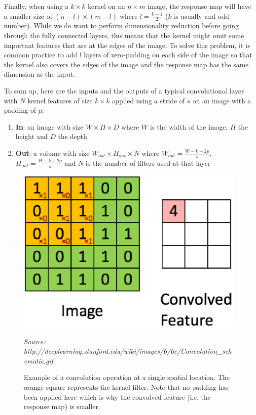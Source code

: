 \documentclass[12pt,twoside]{article}
\newcommand{\source}[1]{\vspace{-3pt} \caption*{ \footnotesize{\textit{Source: {#1}}}} }
\begin{document}
Finally, when using a $k\times k$ kernel on an $n \times m$ image, the response map will have a smaller
size of $(n-l)\times(m-l)$ where $l=\frac{k-1}{2}$ ($k$ is usually and odd
number). While we do want to perform dimensionality reduction before going
through the fully connected layers, this means that the kernel might omit some
important features that are at the edges of the image. To solve this problem,
it is common practice to add $l$ layers of zero-padding on each side of the
image so that the kernel also covers the edges of the image and the response
map has the same dimension as the input.

To sum up, here are the inputs and the outputs of a typical convolutional
layer with $N$ kernel features of size $k \times k$ applied using a stride of
$s$ on an image with a padding of $p$:

\begin{enumerate}
  \item \textbf{In}: an image with size $W \times H \times D$ where $W$ is the
    width of the image, $H$ the height and $D$ the depth
  \item \textbf{Out}: a volume with size $W_{out} \times H_{out} \times N$
    where $W_{out} = \frac{W - k + 2p}{s}$, $H_{out} = \frac{H- k + 2p}{s}$ and
    $N$ is the number of filters used at that layer
\end{enumerate}


\begin{figure}[ht]
  \centering
  \includegraphics[scale=0.5]{./figures/convolution_example.eps}
  \caption{Example of a convolution operation at a single spatial location. The
  orange square represents the kernel filter. Note that no padding has been
applied here which is why the convolved feature (i.e. the response map) is
smaller.}
  \source{http://deeplearning.stanford.edu/wiki/images/6/6c/Convolution\_schematic.gif}
  \label{fig:conv_op}
\end{figure}
\end{document}
